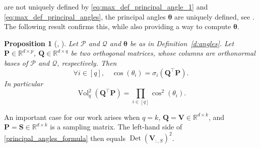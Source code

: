 \documentclass[twoside,11pt]{book}
\newtheorem{proposition}{Proposition}
\newtheorem{example}{Example}
\DeclareMathOperator{\Det}{Det}
\DeclareMathOperator{\Vol}{Vol}
\DeclareMathOperator{\Tran}{\intercal}
\newcommand{\ab}[1]{\textcolor{red}{#1}}
\begin{document}
are not uniquely defined by \eqref{eq:max_def_principal_angle_1} and \eqref{eq:max_def_principal_angles}, the principal angles $\bm{\theta}$ are uniquely defined, see \citep{BjGo73}. The following result confirms this, while also providing a way to compute $\bm{\theta}$.
\begin{proposition}[\citealp{BjGo73}, \citealp{Ben92}]
  \label{principal_angles_theorem_1}
Let $\mathcal{P}$ and $\mathcal{Q}$ and $\bm{\theta}$ be as in Definition~\ref{d:angles}. Let $\bm{P} \in \mathbb{R}^{d \times p}$, $\bm{Q} \in \mathbb{R}^{d \times q}$ be two orthogonal matrices, whose columns are orthonormal bases of $\mathcal{P}$ and $\mathcal{Q}$, respectively. Then
\begin{equation}
 \forall i \in [q], \quad \cos(\theta_{i}) =\sigma_i(\bm{Q}^{\Tran}\bm{P}).
\end{equation}
In particular
\begin{equation}\label{principal_angles_formula}
\Vol_{q}^{2}(\bm{Q}^{\Tran}\bm{P}) = \prod\limits_{i \in [q]} \cos^{2}(\theta_{i}).
\end{equation}
\end{proposition}
An important case for our work arises when $q=k$, $\bm{Q}=\bm{V} \in \mathbb{R}^{d \times k}$, and $\bm{P}=\bm{S}\in \mathbb{R}^{d \times k}$ is a sampling matrix. The left-hand side of \eqref{principal_angles_formula} then equals $\Det(\bm{V}_{:,S})^2$.

\end{document}
